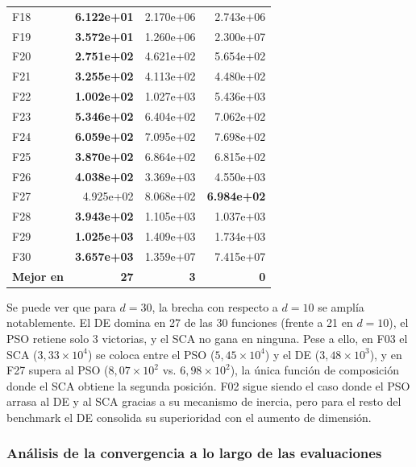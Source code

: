 \documentclass[12pt,a4paper]{article}
\begin{document}
\begin{longtable}{lrrr}
F18  & \textbf{6.122e+01} & 2.170e+06 & 2.743e+06 \\
F19  & \textbf{3.572e+01} & 1.260e+06 & 2.300e+07 \\
F20  & \textbf{2.751e+02} & 4.621e+02 & 5.654e+02 \\
F21  & \textbf{3.255e+02} & 4.113e+02 & 4.480e+02 \\
F22  & \textbf{1.002e+02} & 1.027e+03 & 5.436e+03 \\
F23  & \textbf{5.346e+02} & 6.404e+02 & 7.062e+02 \\
F24  & \textbf{6.059e+02} & 7.095e+02 & 7.698e+02 \\
F25  & \textbf{3.870e+02} & 6.864e+02 & 6.815e+02 \\
F26  & \textbf{4.038e+02} & 3.369e+03 & 4.550e+03 \\
F27  & 4.925e+02 & 8.068e+02 & \textbf{6.984e+02} \\
F28  & \textbf{3.943e+02} & 1.105e+03 & 1.037e+03 \\
F29  & \textbf{1.025e+03} & 1.409e+03 & 1.734e+03 \\
F30  & \textbf{3.657e+03} & 1.359e+07 & 7.415e+07 \\
\midrule
\textbf{Mejor en} & \textbf{27} & \textbf{3} & \textbf{0} \\
\end{longtable}
 
Se puede ver que para $d=30$, la brecha con respecto a $d=10$ se amplía notablemente. El DE domina en 27 de las 30 funciones (frente a 21 en $d=10$), el PSO retiene solo 3 victorias, y el SCA no gana en ninguna. Pese a ello, en F03 el SCA ($3{,}33 \times 10^4$) se coloca entre el PSO ($5{,}45 \times 10^4$) y el DE ($3{,}48 \times 10^3$), y en F27 supera al PSO ($8{,}07 \times 10^2$ vs. $6{,}98 \times 10^2$), la única función de composición donde el SCA obtiene la segunda posición. F02 sigue siendo el caso donde el PSO arrasa al DE y al SCA gracias a su mecanismo de inercia, pero para el resto del benchmark el DE consolida su superioridad con el aumento de dimensión.
 
\subsubsection{Análisis de la convergencia a lo largo de las evaluaciones}
 
\end{document}
